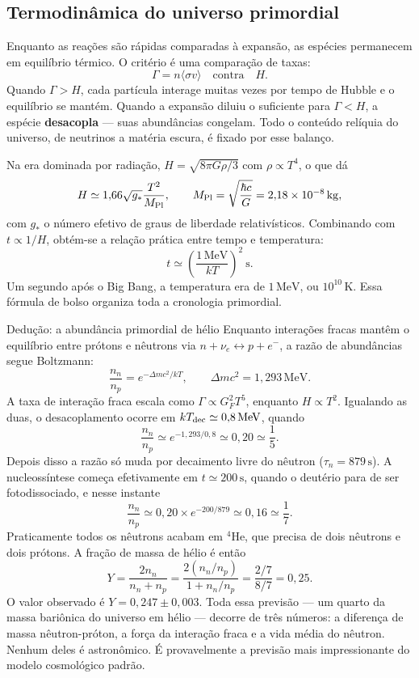 \documentclass[11pt,a4paper]{article}
\begin{document}
\subsection*{Termodinâmica do universo primordial}

Enquanto as reações são rápidas comparadas à expansão, as espécies permanecem em equilíbrio térmico. O critério é uma comparação de taxas:
\[
\Gamma=n\langle\sigma v\rangle
\quad\text{contra}\quad
H.
\]
Quando $\Gamma>H$, cada partícula interage muitas vezes por tempo de Hubble e o equilíbrio se mantém. Quando a expansão diluiu o suficiente para $\Gamma<H$, a espécie \textbf{desacopla} --- suas abundâncias congelam. Todo o conteúdo relíquia do universo, de neutrinos a matéria escura, é fixado por esse balanço.

Na era dominada por radiação, $H=\sqrt{8\pi G\rho/3}$ com $\rho\propto T^{4}$, o que dá
\[
H\simeq1{,}66\sqrt{g_*}\frac{T^{2}}{M_{\rm Pl}},
\qquad
M_{\rm Pl}=\sqrt{\frac{\hbar c}{G}}=2{,}18\times10^{-8}\,\mathrm{kg},
\]
com $g_*$ o número efetivo de graus de liberdade relativísticos. Combinando com $t\propto1/H$, obtém-se a relação prática entre tempo e temperatura:
\[
t\simeq\left(\frac{1\,\mathrm{MeV}}{kT}\right)^{2}\ \mathrm{s}.
\]
Um segundo após o Big Bang, a temperatura era de $1\,\mathrm{MeV}$, ou $10^{10}\,\mathrm{K}$. Essa fórmula de bolso organiza toda a cronologia primordial.

\begin{lessonblock}[borderline west={2pt}{0pt}{astroGold}]{Dedução: a abundância primordial de hélio}
Enquanto interações fracas mantêm o equilíbrio entre prótons e nêutrons via $n+\nu_e\leftrightarrow p+e^{-}$, a razão de abundâncias segue Boltzmann:
\[
\frac{n_n}{n_p}=e^{-\Delta mc^{2}/kT},
\qquad
\Delta mc^{2}=1{,}293\,\mathrm{MeV}.
\]
A taxa de interação fraca escala como $\Gamma\propto G_F^{2}T^{5}$, enquanto $H\propto T^{2}$. Igualando as duas, o desacoplamento ocorre em $kT_{\rm dec}\simeq0{,}8\,\mathrm{MeV}$, quando
\[
\frac{n_n}{n_p}\simeq e^{-1{,}293/0{,}8}\simeq0{,}20\simeq\frac{1}{5}.
\]
Depois disso a razão só muda por decaimento livre do nêutron ($\tau_n=879\,\mathrm{s}$). A nucleossíntese começa efetivamente em $t\simeq200\,\mathrm{s}$, quando o deutério para de ser fotodissociado, e nesse instante
\[
\frac{n_n}{n_p}\simeq0{,}20\times e^{-200/879}\simeq0{,}16\simeq\frac{1}{7}.
\]
Praticamente todos os nêutrons acabam em $^{4}$He, que precisa de dois nêutrons e dois prótons. A fração de massa de hélio é então
\[
Y=\frac{2n_n}{n_n+n_p}=\frac{2(n_n/n_p)}{1+n_n/n_p}=\frac{2/7}{8/7}=0{,}25.
\]
O valor observado é $Y=0{,}247\pm0{,}003$. Toda essa previsão --- um quarto da massa bariônica do universo em hélio --- decorre de três números: a diferença de massa nêutron-próton, a força da interação fraca e a vida média do nêutron. Nenhum deles é astronômico. É provavelmente a previsão mais impressionante do modelo cosmológico padrão.
\end{lessonblock}
\end{document}
